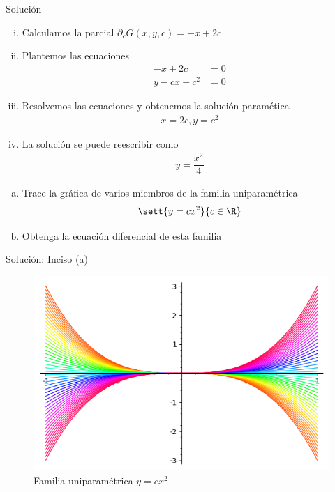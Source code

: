 {Solución}
\begin{enumerate}[(i)]
  \item Calculamos la parcial $
   \partial_{c}G(x,y,c) =-x+2c$
 
 \item Plantemos las ecuaciones
   \begin{align}
  -x+2c&=0\\
  y-cx+c^2&=0
  \end{align}
  
  \item Resolvemos las ecuaciones y obtenemos la solución paramética
     \begin{align}
   x=2c, y =c^{2}
   \end{align}
   
   \item La solución se puede reescribir como
       \begin{align}
    y = \dfrac{x^2}{4}
    \end{align}
\end{enumerate}


{}
  \begin{solved}
   \begin{enumerate}[(a)]
     \item Trace la gráfica de varios miembros de la familia uniparamétrica $$\sett{y=cx^2}{c\in \R}$$ 
     \item Obtenga la ecuación diferencial de esta familia
\end{enumerate}
  \end{solved}


{Solución: Inciso (a)}
  \begin{figure}
 \centering
 \includegraphics[height=.5\textheight,keepaspectratio=true]{./edo/solved_problem_02-06.png}
 \caption{Familia uniparamétrica $y=cx^2$}
 \label{fig:solved0206}
\end{figure}



